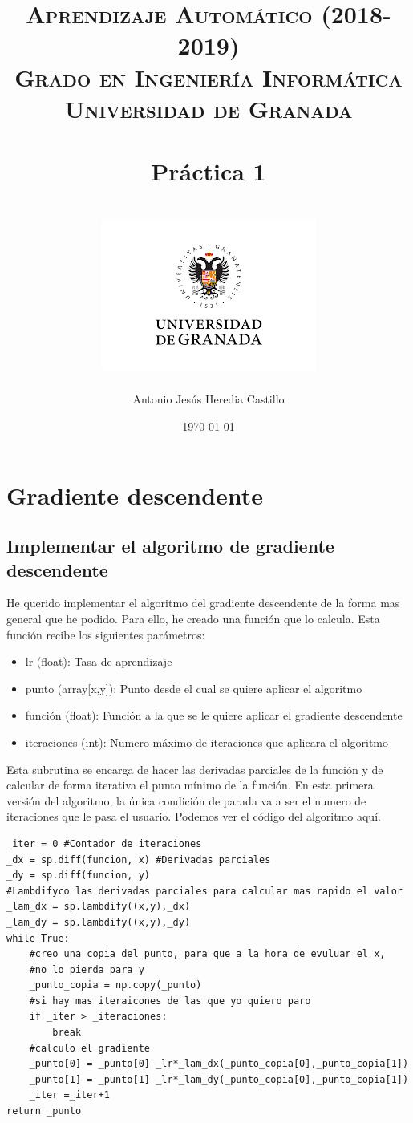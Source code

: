 \documentclass[12pt,a4paper]{article}
\title{
\normalfont \normalsize 
\textsc{{\bf Aprendizaje Automático (2018-2019)} \\ Grado en Ingeniería Informática \\ Universidad de Granada} \\ [25pt] %
\horrule{0.5pt} \\[0.4cm] %
\huge Práctica 1 \\ %
\horrule{2pt} \\[0.5cm] %
\includegraphics{images/logo.png}	
}
\author{Antonio Jesús Heredia Castillo} %
\date{\normalsize\today} %
\begin{document}
\maketitle %
\newpage %
\tableofcontents %
\listoffigures
\listoftables
\newpage

\section{Gradiente descendente}
\subsection{Implementar el algoritmo de gradiente descendente}
He querido implementar el algoritmo del gradiente descendente de la forma mas general que he podido. Para ello, he creado una función que lo calcula. Esta función recibe  los siguientes parámetros:
\begin{itemize}
	\item lr (float): Tasa de aprendizaje
	\item punto (array[x,y]): Punto desde el cual se quiere aplicar el algoritmo
	\item función (float): Función a la que se le quiere aplicar el gradiente descendente
	\item iteraciones (int): Numero máximo de iteraciones que aplicara el algoritmo
\end{itemize}
Esta subrutina se encarga de hacer las derivadas parciales de la función y de calcular de forma iterativa el punto mínimo de la función. En esta primera versión del algoritmo, la única condición de parada va a ser el numero de iteraciones que le pasa el usuario. Podemos ver el código del algoritmo aquí.
\begin{verbatim}
_iter = 0 #Contador de iteraciones
_dx = sp.diff(funcion, x) #Derivadas parciales
_dy = sp.diff(funcion, y)
#Lambdifyco las derivadas parciales para calcular mas rapido el valor
_lam_dx = sp.lambdify((x,y),_dx) 
_lam_dy = sp.lambdify((x,y),_dy)
while True:
	#creo una copia del punto, para que a la hora de evuluar el x, 
	#no lo pierda para y
	_punto_copia = np.copy(_punto)
	#si hay mas iteraicones de las que yo quiero paro
	if _iter > _iteraciones:
		break
	#calculo el gradiente
	_punto[0] = _punto[0]-_lr*_lam_dx(_punto_copia[0],_punto_copia[1])
	_punto[1] = _punto[1]-_lr*_lam_dy(_punto_copia[0],_punto_copia[1])
	_iter =_iter+1
return _punto   
\end{verbatim}
\end{document}
